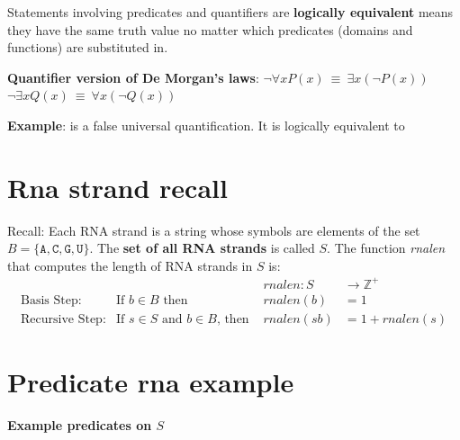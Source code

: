\documentclass[12pt, oneside]{article}
\newcommand{\A}[0]{\texttt{A}}
\newcommand{\C}[0]{\texttt{C}}
\newcommand{\G}[0]{\texttt{G}}
\newcommand{\U}[0]{\texttt{U}}
\begin{document}
Statements involving predicates and quantifiers are {\bf logically equivalent} 
means they have the same truth value no matter which predicates (domains and functions) are substituted in. 

{\bf Quantifier version of De Morgan's laws}: 
$\boxed{\neg \forall x P(x) ~\equiv~ \exists x \left( \neg P(x) \right)}$
\qquad
\qquad
$\boxed{\neg \exists x Q(x) ~\equiv~ \forall x \left( \neg Q(x) \right)}$


{\bf Example}: 
\underline{\phantom{$\forall x ~(P(x) \lor N(x))$}} is a false universal quantification. It is logically equivalent to \underline{\phantom{$\exists x ~\not (P(x) \lor N(x))$}}





\vfill \vfill
\section*{Rna strand recall}


Recall: Each RNA strand is a string whose symbols are elements of the set $B  = \{\A, \C, \G, \U \}$.
The {\bf set of all RNA strands} is called $S$.
The function \textit{rnalen} that computes the length of RNA strands in $S$ is:
\[
\begin{array}{llll}
& & \textit{rnalen} : S & \to \mathbb{Z}^+ \\
\textrm{Basis Step:} & \textrm{If } b \in B\textrm{ then } & \textit{rnalen}(b) & = 1 \\
\textrm{Recursive Step:} & \textrm{If } s \in S\textrm{ and }b \in B\textrm{, then  } & \textit{rnalen}(sb) & = 1 + \textit{rnalen}(s)
\end{array}
\] \vfill
\section*{Predicate rna example}


{\bf Example predicates on $S$}

\vspace{-20pt}
\end{document}
